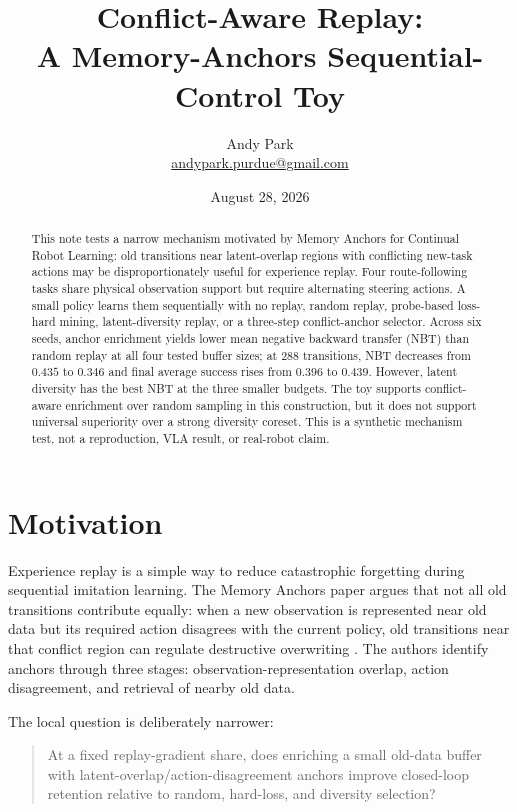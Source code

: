 \documentclass[11pt]{article}
\title{Conflict-Aware Replay:\\A Memory-Anchors Sequential-Control Toy}
\author{Andy Park\\\href{mailto:andypark.purdue@gmail.com}{andypark.purdue@gmail.com}}
\date{August 28, 2026}
\begin{document}
\maketitle

\begin{abstract}
This note tests a narrow mechanism motivated by Memory Anchors for Continual Robot Learning: old transitions near latent-overlap regions with conflicting new-task actions may be disproportionately useful for experience replay. Four route-following tasks share physical observation support but require alternating steering actions. A small policy learns them sequentially with no replay, random replay, probe-based loss-hard mining, latent-diversity replay, or a three-step conflict-anchor selector. Across six seeds, anchor enrichment yields lower mean negative backward transfer (NBT) than random replay at all four tested buffer sizes; at 288 transitions, NBT decreases from $0.435$ to $0.346$ and final average success rises from $0.396$ to $0.439$. However, latent diversity has the best NBT at the three smaller budgets. The toy supports conflict-aware enrichment over random sampling in this construction, but it does not support universal superiority over a strong diversity coreset. This is a synthetic mechanism test, not a reproduction, VLA result, or real-robot claim.
\end{abstract}

\section{Motivation}

Experience replay is a simple way to reduce catastrophic forgetting during sequential imitation learning. The Memory Anchors paper argues that not all old transitions contribute equally: when a new observation is represented near old data but its required action disagrees with the current policy, old transitions near that conflict region can regulate destructive overwriting \cite{paper,project}. The authors identify anchors through three stages: observation-representation overlap, action disagreement, and retrieval of nearby old data.

The local question is deliberately narrower:
\begin{quote}
At a fixed replay-gradient share, does enriching a small old-data buffer with latent-overlap/action-disagreement anchors improve closed-loop retention relative to random, hard-loss, and diversity selection?
\end{quote}
\end{document}
